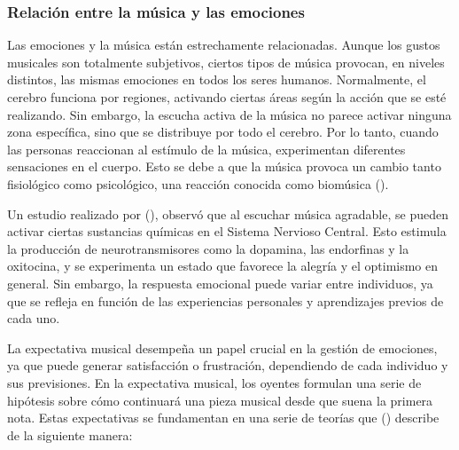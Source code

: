 \subsubsection{Relación entre la música y las emociones}

Las emociones y la música están estrechamente relacionadas. Aunque los gustos musicales son totalmente subjetivos, ciertos tipos de música provocan, en niveles distintos, las mismas emociones en todos los seres humanos. Normalmente, el cerebro funciona por regiones, activando ciertas áreas según la acción que se esté realizando. Sin embargo, la escucha activa de la música no parece activar ninguna zona específica, sino que se distribuye por todo el cerebro. Por lo tanto, cuando las personas reaccionan al estímulo de la música, experimentan diferentes sensaciones en el cuerpo. Esto se debe a que la música provoca un cambio tanto fisiológico como psicológico, una reacción conocida como biomúsica (\cite{MOSQUERA:2013}).

Un estudio realizado por \citeauthor{MOSQUERA:2013} (\citeyear{MOSQUERA:2013}), observó que al escuchar música agradable, se pueden activar ciertas sustancias químicas en el Sistema Nervioso Central. Esto estimula la producción de neurotransmisores como la dopamina, las endorfinas y la oxitocina, y se experimenta un estado que favorece la alegría y el optimismo en general. Sin embargo, la respuesta emocional puede variar entre individuos, ya que se refleja en función de las experiencias personales y aprendizajes previos de cada uno.

La expectativa musical desempeña un papel crucial en la gestión de emociones, ya que puede generar satisfacción o frustración, dependiendo de cada individuo y sus previsiones. En la expectativa musical, los oyentes formulan una serie de hipótesis sobre cómo continuará una pieza musical desde que suena la primera nota. Estas expectativas se fundamentan en una serie de teorías que \citeauthor{SENABRE:2019} (\citeyear{SENABRE:2019}) describe de la siguiente manera:

